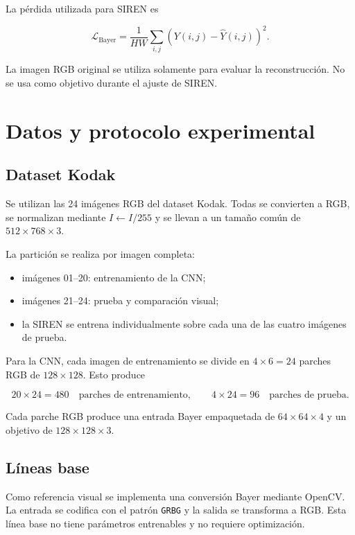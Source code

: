 \documentclass[11pt,a4paper]{article}
\begin{document}
La pérdida utilizada para SIREN es

\begin{equation}
    \mathcal{L}_{\mathrm{Bayer}}=
    \frac{1}{HW}\sum_{i,j}\left(Y(i,j)-\hat Y(i,j)\right)^2.
    \label{eq:loss-siren}
\end{equation}

La imagen RGB original se utiliza solamente para evaluar la reconstrucción. No se usa como objetivo durante el ajuste de SIREN.

\section{Datos y protocolo experimental}

\subsection{Dataset Kodak}

Se utilizan las 24 imágenes RGB del dataset Kodak. Todas se convierten a RGB, se normalizan mediante $I\leftarrow I/255$ y se llevan a un tamaño común de $512\times768\times3$.

La partición se realiza por imagen completa:

\begin{itemize}
    \item imágenes 01--20: entrenamiento de la CNN;
    \item imágenes 21--24: prueba y comparación visual;
    \item la SIREN se entrena individualmente sobre cada una de las cuatro imágenes de prueba.
\end{itemize}

Para la CNN, cada imagen de entrenamiento se divide en $4\times6=24$ parches RGB de $128\times128$. Esto produce

\begin{equation}
    20\times24=480\quad\text{parches de entrenamiento},
    \qquad
    4\times24=96\quad\text{parches de prueba}.
    \label{eq:patches}
\end{equation}

Cada parche RGB produce una entrada Bayer empaquetada de $64\times64\times4$ y un objetivo de $128\times128\times3$.

\subsection{Líneas base}

Como referencia visual se implementa una conversión Bayer mediante OpenCV. La entrada se codifica con el patrón \texttt{GRBG} y la salida se transforma a RGB. Esta línea base no tiene parámetros entrenables y no requiere optimización.
\end{document}
